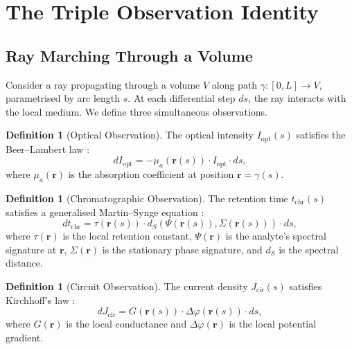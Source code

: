 \documentclass[11pt,twocolumn,a4paper]{article}
\theoremstyle{definition}
\newtheorem{definition}[theorem]{Definition}
\theoremstyle{remark}
\newcommand{\Iopt}{I_{\mathrm{opt}}}
\newcommand{\tchr}{t_{\mathrm{chr}}}
\newcommand{\Jcir}{J_{\mathrm{cir}}}
\begin{document}
\section{The Triple Observation Identity}\label{sec:triple-observation}

\subsection{Ray Marching Through a Volume}

Consider a ray propagating through a volume $V$ along path $\gamma : [0, L] \to V$, parametrised by arc length $s$.  At each differential step $ds$, the ray interacts with the local medium.  We define three simultaneous observations.

\begin{definition}[Optical Observation]\label{def:optical-obs}
The optical intensity $\Iopt(s)$ satisfies the Beer--Lambert law \citep{beer1852bestimmung, lambert1760photometria}:
\begin{equation}\label{eq:beer-lambert}
    d\Iopt = -\mu_a(\mathbf{r}(s)) \cdot \Iopt \cdot ds,
\end{equation}
where $\mu_a(\mathbf{r})$ is the absorption coefficient at position $\mathbf{r} = \gamma(s)$.
\end{definition}

\begin{definition}[Chromatographic Observation]\label{def:chromatographic-obs}
The retention time $\tchr(s)$ satisfies a generalised Martin--Synge equation \citep{martin1941new}:
\begin{equation}\label{eq:chromatographic}
    d\tchr = \tau(\mathbf{r}(s)) \cdot d_S\!\left(\Psi(\mathbf{r}(s)), \Sigma(\mathbf{r}(s))\right) \cdot ds,
\end{equation}
where $\tau(\mathbf{r})$ is the local retention constant, $\Psi(\mathbf{r})$ is the analyte's spectral signature at $\mathbf{r}$, $\Sigma(\mathbf{r})$ is the stationary phase signature, and $d_S$ is the spectral distance.
\end{definition}

\begin{definition}[Circuit Observation]\label{def:circuit-obs}
The current density $\Jcir(s)$ satisfies Kirchhoff's law \citep{kirchhoff1845ueber}:
\begin{equation}\label{eq:kirchhoff}
    d\Jcir = G(\mathbf{r}(s)) \cdot \Delta\varphi(\mathbf{r}(s)) \cdot ds,
\end{equation}
where $G(\mathbf{r})$ is the local conductance and $\Delta\varphi(\mathbf{r})$ is the local potential gradient.
\end{definition}
\end{document}
